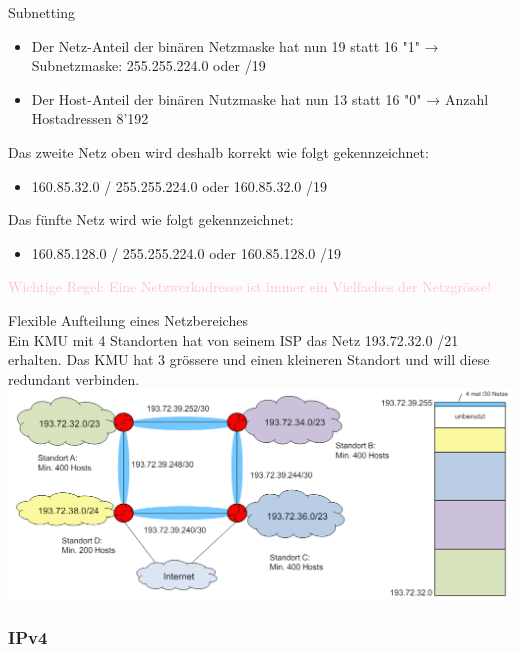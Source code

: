 \begin{concept}{Subnetting}
    \begin{itemize}
        \item Der Netz-Anteil der binären Netzmaske hat nun 19 statt 16 "1" → Subnetzmaske: 255.255.224.0 oder /19
        \item Der Host-Anteil der binären Nutzmaske hat nun 13 statt 16 "0" → Anzahl Hostadressen 8'192
    \end{itemize}
    Das zweite Netz oben wird deshalb korrekt wie folgt gekennzeichnet:
    \begin{itemize}
        \item 160.85.32.0 / 255.255.224.0 oder 160.85.32.0 /19
    \end{itemize}
    Das fünfte Netz wird wie folgt gekennzeichnet:
    \begin{itemize}
        \item 160.85.128.0 / 255.255.224.0 oder 160.85.128.0 /19
    \end{itemize}
    \textcolor{pink}{Wichtige Regel: Eine Netzwerkadresse ist immer ein Vielfaches der Netzgrösse!}
\end{concept}

\begin{example2}{Flexible Aufteilung eines Netzbereiches}\\
    Ein KMU mit 4 Standorten hat von seinem ISP das Netz 193.72.32.0 /21 erhalten. Das KMU hat 3 grössere und einen kleineren Standort und will diese redundant verbinden.\\
        \includegraphics[width=1\linewidth]{images/flexible_aufteilung_netzbereich.png}    
\end{example2}

\subsubsection{IPv4}

